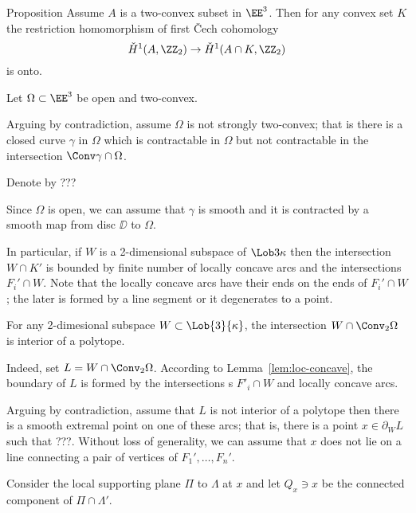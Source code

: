 \begin{thm}{Proposition}\label{prop:stong-two-convex}
Assume $A$ is a  two-convex subset in $\EE^3$.
Then for any convex set $K$ the restriction homomorphism of first \v{C}ech cohomology
\[\check{H}^1(A,\ZZ_2)\to \check{H}^1(A\cap K,\ZZ_2)\]
is onto.
\end{thm}

Let $\Omega\subset \EE^3$ be open and two-convex.

Arguing by contradiction, assume $\Omega$ is not strongly two-convex;
that is there is a closed curve $\gamma$
in $\Omega$ 
which is contractable in $\Omega$ but not contractable in the intersection $\Conv\gamma\cap \Omega$.

Denote by ???

Since $\Omega$ is open, 
we can assume that $\gamma$ is smooth
and it is contracted by a smooth map from disc $\DD$ to $\Omega$.

 
\qeds













In particular, if $W$ is a 2-dimensional subspace of $\Lob3\kappa$ 
then the intersection $W\cap K'$ is bounded 
by finite number of locally concave arcs and the  intersections $F_i'\cap W$.
Note that the locally concave arcs have their ends on the ends of $F_i'\cap W$;
the later is formed by a line segment or it degenerates to a point.

\begin{clm}{}\label{clm:intersection-is-polytope}
For any 2-dimesional subspace $W\subset\Lob{3}{\kappa}$,
the intersection $W\cap \Conv_2 \Omega$ is interior of a polytope.
\end{clm}

Indeed, set $L=W\cap \Conv_2 \Omega$.
According to Lemma~\ref{lem:loc-concave}, 
the boundary of $L$ is formed by the intersections s $F'_i\cap W$
and locally concave arcs.

Arguing by contradiction, 
assume that $L$ is not interior of a polytope then there is a smooth extremal point on one of these arcs; 
that is, there is a point $x\in\partial_W L$ such that ???.
Without loss of generality, we can assume that $x$ does not lie on a line connecting a pair of vertices of $F_1',\dots,F_n'$.

Consider the local supporting plane $\Pi$ to $\Lambda$ at $x$
and let $Q_x\ni x$ be the connected component of $\Pi\cap\Lambda'$.

